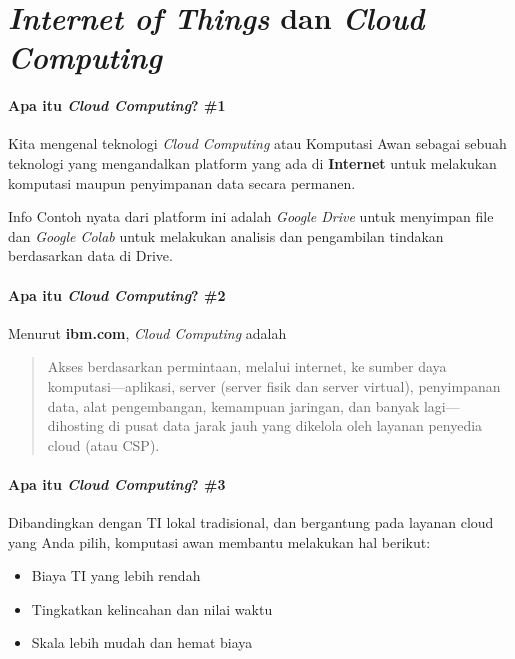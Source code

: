 

\section{\textit{Internet of Things} dan \textit{Cloud Computing}}
\begin{frame}{\insertsectionhead}
	\framesubtitle{Apa itu \textit{Cloud Computing}? \#1}
	\justifying
	Kita mengenal teknologi \textit{Cloud Computing} atau Komputasi Awan sebagai sebuah teknologi yang mengandalkan platform yang ada di \textbf{Internet} untuk melakukan komputasi maupun penyimpanan data secara permanen.
	\vfill
	\begin{block}{Info}
		Contoh nyata dari platform ini adalah \textit{Google Drive} untuk menyimpan file dan \textit{Google Colab} untuk melakukan analisis dan pengambilan tindakan berdasarkan data di Drive.
	\end{block}
\end{frame}

\begin{frame}{\insertsectionhead}
	\framesubtitle{Apa itu \textit{Cloud Computing}? \#2}
	\justifying
	Menurut \textbf{ibm.com}, \textit{Cloud Computing} adalah
	\vfill
	\begin{quote}
		Akses berdasarkan permintaan, melalui internet, ke sumber daya komputasi—aplikasi, server (server fisik dan server virtual), penyimpanan data, alat pengembangan, kemampuan jaringan, dan banyak lagi—dihosting di pusat data jarak jauh yang dikelola oleh layanan penyedia cloud (atau CSP).
	\end{quote}
\end{frame}

\begin{frame}{\insertsectionhead}
	\framesubtitle{Apa itu \textit{Cloud Computing}? \#3}
	\justifying
	Dibandingkan dengan TI lokal tradisional, dan bergantung pada layanan cloud yang Anda pilih, komputasi awan membantu melakukan hal berikut:
	\vfill
	\begin{itemize}
		\item Biaya TI yang lebih rendah
		\item Tingkatkan kelincahan dan nilai waktu
		\item Skala lebih mudah dan hemat biaya
	\end{itemize}
\end{frame}

